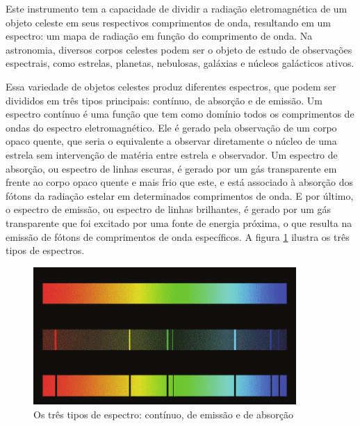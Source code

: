 Este instrumento tem a capacidade de dividir a radiação eletromagnética de um objeto celeste em seus respectivos comprimentos de onda, resultando em um espectro: um mapa de radiação em função do comprimento de onda. Na astronomia, diversos corpos celestes podem ser o objeto de estudo de observações espectrais, como estrelas, planetas, nebulosas, galáxias e núcleos galácticos ativos.  


Essa variedade de objetos celestes produz diferentes espectros, que podem ser divididos em três tipos principais: contínuo, de absorção e de emissão. Um espectro contínuo é uma função que tem como domínio todos os comprimentos de ondas do espectro eletromagnético.
Ele é gerado pela observação de um corpo opaco quente, que seria o equivalente a observar diretamente o núcleo de uma estrela sem intervenção de matéria entre estrela e observador. Um espectro de absorção, ou espectro de linhas escuras, é gerado por um gás transparente em frente ao corpo opaco quente e mais frio que este, e está associado à absorção dos fótons da radiação estelar em determinados comprimentos de onda. E por último, o espectro de emissão, ou espectro de linhas brilhantes, é gerado por um gás transparente que foi excitado por uma fonte de energia próxima, o que resulta na emissão de fótons de comprimentos de onda específicos. A figura \ref{fig:spectrum-types} ilustra os três tipos de espectros. 

\begin{figure}[htb]
\centering
\includegraphics[width=10cm]{figuras/Continuous-spectrum-and-two-types-of-line-spectra.png}
\caption{Os três tipos de espectro: contínuo, de emissão e de absorção \citep{mcgrawhill}}
\label{fig:spectrum-types}
\end{figure}

